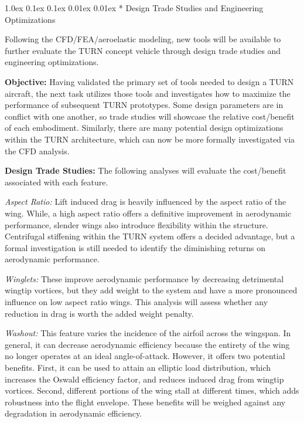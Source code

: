 \documentclass[11pt]{article}
\makeatletter
\renewcommand\subsection{
\@startsection{subsection}{2}{\z@}%
{1.0ex \@plus 0.1ex \@minus 0.1ex}%
{0.01ex \@plus 0.01ex}%
{\normalfont\Large\bfseries}}
\makeatother
\begin{document}
\subsection*{\color{green} Design Trade Studies and Engineering Optimizations}

Following the CFD/FEA/aeroelastic modeling, new tools will be available to further evaluate the TURN concept vehicle through design trade studies and engineering optimizations.


{\color{green} \bf Objective:}
Having validated the primary set of tools needed to design a TURN aircraft, the next task utilizes those tools and investigates how to maximize the performance of subsequent TURN prototypes.  Some design parameters are in conflict with one another, so trade studies will showcase the relative cost/benefit of each embodiment.  Similarly, there are many potential design optimizations within the TURN architecture, which can now be more formally investigated via the CFD analysis.


{\color{green} \bf Design Trade Studies:}
The following analyses will evaluate the cost/benefit associated with each feature.

\emph{Aspect Ratio:}
Lift induced drag is heavily influenced by the aspect ratio of the wing.  While, a high aspect ratio offers a definitive improvement in aerodynamic performance, slender wings also introduce flexibility within the structure.  Centrifugal stiffening within the TURN system offers a decided advantage, but a formal investigation is still needed to identify the diminishing returns on aerodynamic performance.

\emph{Winglets:}
These improve aerodynamic performance by decreasing detrimental wingtip vortices, but they add weight to the system and have a more pronounced influence on low aspect ratio wings.  This analysis will assess whether any reduction in drag is worth the added weight penalty.

\emph{Washout:}
This feature varies the incidence of the airfoil across the wingspan.  In general, it can decrease aerodynamic efficiency because the entirety of the wing no longer operates at an ideal angle-of-attack.  However, it offers two potential benefits.  First, it can be used to attain an elliptic load distribution, which increases the Oswald efficiency factor, and reduces induced drag from wingtip vortices.  Second, different portions of the wing stall at different times, which adds robustness into the flight envelope.  These benefits will be weighed against any degradation in aerodynamic efficiency.
\end{document}
